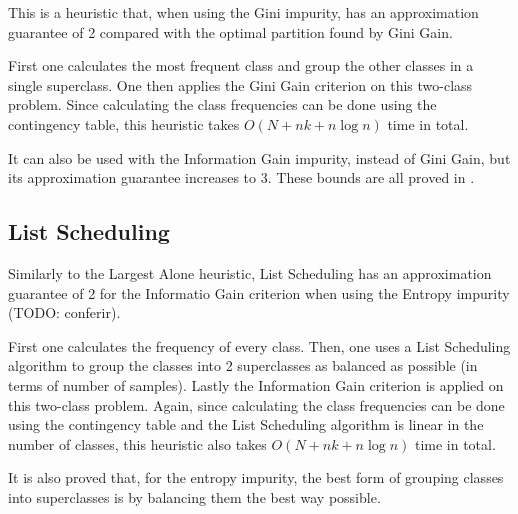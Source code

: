 This is a heuristic that, when using the Gini impurity, has an approximation guarantee of 2 compared with the optimal partition found by Gini Gain.

First one calculates the most frequent class and group the other classes in a single superclass. One then applies the Gini Gain criterion on this two-class problem. Since calculating the class frequencies can be done using the contingency table, this heuristic takes $O(N + n k + n \log n)$ time in total.

It can also be used with the Information Gain impurity, instead of Gini Gain, but its approximation guarantee increases to 3. These bounds are all proved in \cite{icml2018}.

\subsection{List Scheduling}

Similarly to the Largest Alone heuristic, List Scheduling has an approximation guarantee of 2 for the Informatio Gain criterion when using the Entropy impurity (TODO: conferir).

First one calculates the frequency of every class. Then, one uses a List Scheduling algorithm to group the classes into 2 superclasses as balanced as possible (in terms of number of samples). Lastly the Information Gain criterion is applied on this two-class problem. Again, since calculating the class frequencies can be done using the contingency table and the List Scheduling algorithm is linear in the number of classes, this heuristic also takes $O(N + n k + n \log n)$ time in total.

It is also proved that, for the entropy impurity, the best form of grouping classes into superclasses is by balancing them the best way possible.
